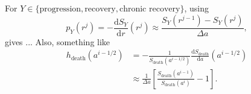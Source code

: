 \documentclass[12pt]{article}
\newcommand{\md}{\mathrm{d}}
\begin{document}

For $Y \in \{\text{progression}, \text{recovery},
\text{chronic recovery}\}$, using
\begin{equation}
  p_Y(r^j) = - \frac{\md S_Y}{\md r} (r^j)
  \approx \frac{S_Y(r^{j - 1}) - S_Y(r^j)}{\Delta a},
\end{equation} gives ...
Also, something like
\begin{equation}
  \begin{split}
    h_{\text{death}}(a^{i - 1 / 2})
    &= - \frac{1}{S_{\text{death}} (a^{i - 1 / 2})}
    \frac{\md S_{\text{death}}}{\md a} (a^{i - 1 / 2})
    \\
    &\approx \frac{1}{\Delta a}
    \left[
      \frac{S_{\text{death}}(a^{i - 1})}{S_{\text{death}}(a^i)} - 1
    \right].
  \end{split}
\end{equation}
\end{document}
